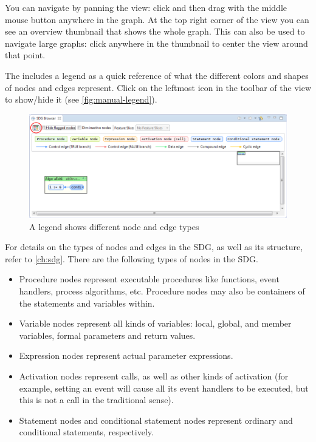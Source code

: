 You can navigate by panning the view: click and then drag with the middle mouse button anywhere in the graph. At the 
top right corner of the \SB view you can see an overview thumbnail that shows the whole graph. This can also be used to 
navigate large graphs: click anywhere in the thumbnail to center the view around that point.

The \SB includes a legend as a quick reference of what the different colors and shapes of nodes and edges represent. 
Click on the leftmost icon in the toolbar of the \SB view to show/hide it (see \autoref{fig:manual-legend}).

\begin{figure}[hp]
  \centering
    \includegraphics[width=\textwidth]{bilder/manual-legend}
  \caption{A legend shows different node and edge types}
  \label{fig:manual-legend}
\end{figure}

For details on the types of nodes and edges in the SDG, as well as its structure, refer to \autoref{ch:sdg}. There are 
the following types of nodes in the SDG.

\begin{itemize}
  \item Procedure nodes represent executable procedures like functions, event handlers, process algorithms, etc. 
  Procedure nodes may also be containers of the statements and variables within.
  
  \item Variable nodes represent all kinds of variables: local, global, and member variables, formal parameters and 
  return values.
  
  \item Expression nodes represent actual parameter expressions.
  
  \item Activation nodes represent calls, as well as other kinds of activation (for example, setting an event will 
  cause all its event handlers to be executed, but this is not a call in the traditional sense).
  
  \item Statement nodes and conditional statement nodes represent ordinary and conditional statements, respectively.
\end{itemize}


